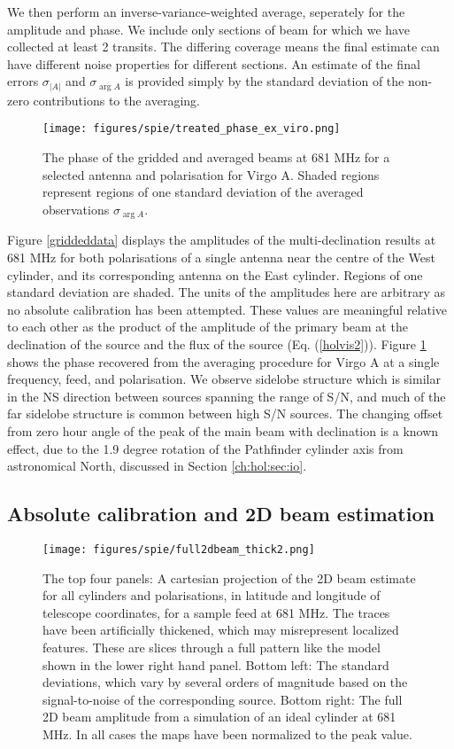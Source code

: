 We then perform an inverse-variance-weighted average, seperately for the amplitude and phase. We include only sections of beam for which we have collected at least 2 transits. The differing coverage means the final estimate can have different noise properties for different sections. An estimate of the final errors $\sigma_{|A|}$ and $\sigma_{\arg{A}}$ is provided simply by the standard deviation of the non-zero contributions to the averaging.

\begin{figure}[h!] %
	\centering
	\texttt{[image: figures/spie/treated\_phase\_ex\_viro.png]}%
	\caption{The phase of the gridded and averaged beams at 681 MHz for a selected antenna and polarisation for Virgo A. Shaded regions represent regions of one standard deviation of the averaged observations $\sigma_{\arg{A}}$.}
	\label{phaseav}
\end{figure} 

Figure \ref{griddeddata} displays the amplitudes of the multi-declination results at 681 MHz for both polarisations of a single antenna near the centre of the West cylinder, and its corresponding antenna on the East cylinder. Regions of one standard deviation are shaded. The units of the amplitudes here are arbitrary as no absolute calibration has been attempted. These values are meaningful relative to each other as the product of the amplitude of the primary beam at the declination of the source and the flux of the source (Eq. (\ref{holvis2})). Figure \ref{phaseav} shows the phase recovered from the averaging procedure for Virgo A at a single frequency, feed, and polarisation. We observe sidelobe structure which is similar in the NS direction between sources spanning the range of S/N, and much of the far sidelobe structure is common between high S/N sources. The changing offset from zero hour angle of the peak of the main beam with declination is a known effect, due to the 1.9 degree rotation of the Pathfinder cylinder axis from astronomical North, discussed in Section \ref{ch:hol:sec:io}.

\subsection{Absolute calibration and 2D beam estimation}

\begin{figure}[t] %
	\centering
	\texttt{[image: figures/spie/full2dbeam\_thick2.png]}%
	\caption{The top four panels: A cartesian projection of the 2D beam estimate for all cylinders and polarisations, in latitude and longitude of telescope coordinates, for a sample feed at 681 MHz. The traces have been artificially thickened, which may misrepresent localized features. These are slices through a full pattern like the model shown in the lower right hand panel. Bottom left: The standard deviations, which vary by several orders of magnitude based on the signal-to-noise of the corresponding source. Bottom right: The full 2D beam amplitude from a simulation of an ideal cylinder at 681 MHz. In all cases the maps have been normalized to the peak value.}
	\label{2dbeamslices}
\end{figure}

